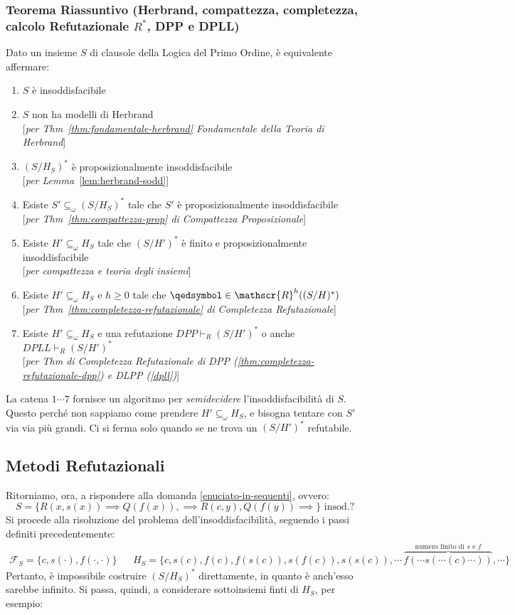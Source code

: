 \subsubsection{Teorema Riassuntivo (Herbrand, compattezza, completezza, calcolo Refutazionale $R^*$, DPP e DPLL)}
Dato un insieme $S$ di clausole della Logica del Primo Ordine, è equivalente affermare:
\begin{enumerate}
  \item $S$ è insoddisfacibile 
  \item $S$ non ha modelli di Herbrand \\
  {[\textit{per Thm~\ref{thm:fondamentale-herbrand} Fondamentale della Teoria di Herbrand}]}
  \item $(S/H_S)^*$ è proposizionalmente insoddisfacibile \\
  {[\textit{per Lemma~}\ref{lem:herbrand-sodd}]}
  \item Esiste $S' \subseteq_{\omega} (S/H_S)^*$ tale che $S'$ è proposizionalmente insoddisfacibile \\
  {[\textit{per Thm~\ref{thm:compattezza-prop} di Compattezza Proposizionale}]}
  \item Esiste $H'\subseteq_{\omega} H_S$ tale che $(S/H')^*$ è finito e proposizionalmente insoddisfacibile \\
  {[\textit{per compattezza e teoria degli insiemi}]}
  \item Esiste $H' \subseteq_{\omega} H_S$ e $h \geq 0$ tale che $\qedsymbol \in \mathscr{R}^h((S/H)^*)$ \\
  {[\textit{per Thm~\ref{thm:completezza-refutazionale} di Completezza Refutazionale}]}
  \item Esiste $H' \subseteq_{\omega} H_S$ e una refutazione $DPP \vdash_R (S/H')^*$ o anche $DPLL \vdash_R (S/H')^*$ \\
  {[\textit{per Thm di Completezza Refutazionale di DPP (\ref{thm:completezza-refutazionale-dpp}) e DLPP (\ref{dpll})}]}
\end{enumerate}
La catena $1 \cdots 7$ fornisce un algoritmo per \textit{semidecidere} l'insoddisfacibilità di $S$. Questo perché non sappiamo come prendere $H' \subseteq_\omega H_S$, e bisogna tentare con $S'$ via via più grandi. Ci si ferma solo quando se ne trova un $(S/H')^*$ refutabile. 

\subsection{Metodi Refutazionali}
Ritorniamo, ora, a rispondere alla domanda \ref{enuciato-in-sequenti}, ovvero: 
$$
  S = \{ R(x,s(x)) \implies Q(f(x)), \implies R(c,y), Q(f(y)) \implies\} \text{ insod.?}
$$
Si procede alla risoluzione del problema dell'insoddisfacibilità, seguendo 
i passi definiti precedentemente: 
\begin{align*}
\mathscr{F}_S = \{c, s(\cdot), f(\cdot, \cdot)\} &&
H_S = \{c, s(c), f(c), f(s(c)), s(f(c)), s(s(c)), \cdots\, \overbrace{f(\cdots s( \cdots (c) \cdots))}^{\text{numero finito di } s \text{ e } f}, \cdots\}
\end{align*}
Pertanto, è impossibile costruire $(S/H_S)^*$ direttamente, in quanto è anch'esso sarebbe infinito. Si passa, quindi, a considerare sottoinsiemi finti di $H_S$, per esempio:
